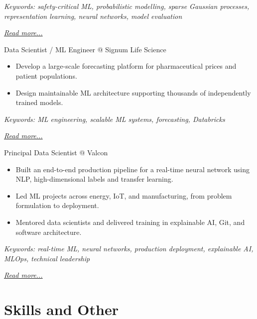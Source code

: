 \documentclass[11pt,a4paper]{moderncv}
\begin{document}
{\footnotesize\textit{Keywords: safety-critical ML, probabilistic modelling, sparse Gaussian processes, representation learning, neural networks, model evaluation}}

\hfill{\small{\textit{\hyperref[sec:raysearch]{Read more...}}}}

\large{Data Scientist / ML Engineer @ Signum Life Science}
\normalsize
\begin{itemize}
\item Develop a large-scale forecasting platform for pharmaceutical prices and patient populations.
\item Design maintainable ML architecture supporting thousands of independently trained models.
\end{itemize}

{\footnotesize\textit{Keywords: ML engineering, scalable ML systems, forecasting, Databricks}}

\hfill{\small{\textit{\hyperref[sec:signum]{Read more...}}}}

\large{Principal Data Scientist @ Valcon}
\normalsize
\begin{itemize}
\item Built an end-to-end production pipeline for a real-time neural network using NLP, high-dimensional labels and transfer learning.
\item Led ML projects across energy, IoT, and manufacturing, from problem formulation to deployment.
\item Mentored data scientists and delivered training in explainable AI, Git, and software architecture.
\end{itemize}

{\footnotesize\textit{Keywords: real-time ML, neural networks, production deployment, explainable AI, MLOps, technical leadership}}

\hfill{\small{\textit{\hyperref[sec:valcon]{Read more...}}}}


\section{Skills and Other}
\normalsize
{}
\end{document}
